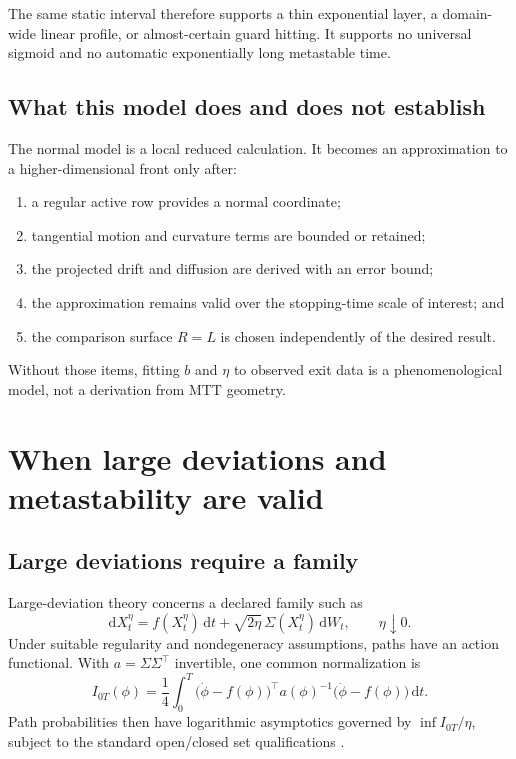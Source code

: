 \documentclass[11pt]{article}
\theoremstyle{definition}
\theoremstyle{remark}
\newcommand{\dd}{\mathrm d}
\begin{document}
The same static interval therefore supports a thin exponential layer, a
domain-wide linear profile, or almost-certain guard hitting.  It supports
no universal sigmoid and no automatic exponentially long metastable time.

\subsection{What this model does and does not establish}

The normal model is a local reduced calculation.  It becomes an
approximation to a higher-dimensional front only after:
\begin{enumerate}[leftmargin=2em]
\item a regular active row provides a normal coordinate;
\item tangential motion and curvature terms are bounded or retained;
\item the projected drift and diffusion are derived with an error bound;
\item the approximation remains valid over the stopping-time scale of
      interest; and
\item the comparison surface \(R=L\) is chosen independently of the
      desired result.
\end{enumerate}

Without those items, fitting \(b\) and \(\eta\) to observed exit data is a
phenomenological model, not a derivation from MTT geometry.

\section{When large deviations and metastability are valid}
\label{sec:metastability}

\subsection{Large deviations require a family}

Large-deviation theory concerns a declared family such as
\[
 \dd X_t^\eta
 =
 f(X_t^\eta)\,\dd t
 +
 \sqrt{2\eta}\,\Sigma(X_t^\eta)\,\dd W_t,
 \qquad \eta\downarrow0.
\]
Under suitable regularity and nondegeneracy assumptions, paths have an
action functional.  With \(a=\Sigma\Sigma^\top\) invertible, one common
normalization is
\[
 I_{0T}(\phi)
 =
 \frac14\int_0^T
 \bigl(\dot\phi-f(\phi)\bigr)^\top
 a(\phi)^{-1}
 \bigl(\dot\phi-f(\phi)\bigr)\,\dd t.
\]
Path probabilities then have logarithmic asymptotics governed by
\(\inf I_{0T}/\eta\), subject to the standard open/closed set
qualifications
\cite{FreidlinWentzell2012,MatkowskySchuss1977}.
\end{document}
